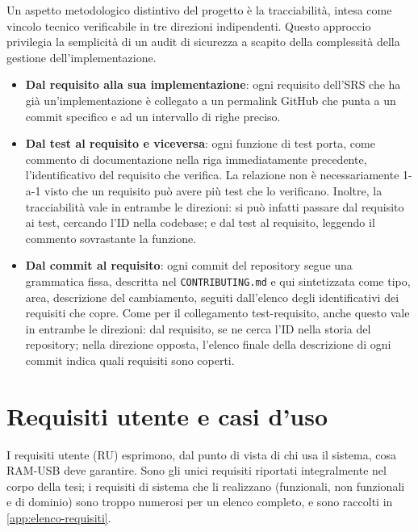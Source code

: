 Un aspetto metodologico distintivo del progetto è la tracciabilità, intesa come vincolo tecnico
verificabile in tre direzioni indipendenti.
Questo approccio privilegia la semplicità di un audit di sicurezza a scapito della complessità della 
gestione dell'implementazione.

\begin{itemize}
    \item \textbf{Dal requisito alla sua implementazione}: ogni requisito dell'SRS che ha già un'implementazione è collegato 
    a un permalink GitHub che punta a un commit specifico e ad un intervallo di righe preciso. 
    
    \item \textbf{Dal test al requisito e viceversa}: ogni funzione di test porta, come commento di documentazione
    nella riga immediatamente precedente, l'identificativo del requisito che verifica. 
    La relazione non è necessariamente 1-a-1 visto che un requisito può avere più test che lo verificano.
    Inoltre, la tracciabilità vale in entrambe le direzioni: si può infatti passare dal requisito 
    ai test, cercando l'ID nella codebase; e dal test al requisito, leggendo il commento sovrastante la funzione.
    \item \textbf{Dal commit al requisito}: ogni commit del repository segue una grammatica fissa,
    descritta nel
    \texttt{CONTRIBUTING.md} \cite{ramusb-contributing-commit-structure}
     e qui sintetizzata come tipo, area, descrizione del cambiamento,
    seguiti dall'elenco degli identificativi dei requisiti che copre.
    Come per il collegamento test-requisito, anche questo vale in entrambe le direzioni:
    dal requisito, se ne cerca l'ID nella storia del repository; nella direzione opposta,
    l'elenco finale della descrizione di ogni commit indica quali requisiti sono coperti.
\end{itemize}


\section{Requisiti utente e casi d'uso}

I requisiti utente (RU) esprimono, dal punto di vista di chi usa il sistema, cosa RAM-USB deve garantire. 
Sono gli unici requisiti riportati integralmente nel corpo della tesi; i requisiti di sistema che li
realizzano (funzionali, non funzionali e di dominio) sono troppo numerosi per un elenco completo, e sono 
raccolti in \autoref{app:elenco-requisiti}.

